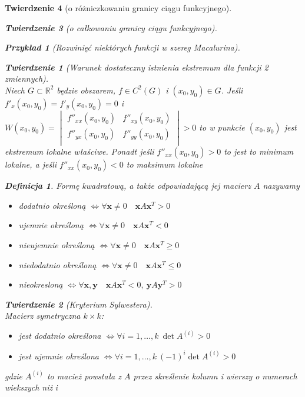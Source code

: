 \documentclass[12pt,a4paper]{article}
\newtheorem{tw}{Twierdzenie}
\newtheorem{przyklad}{Przykład}
\theoremstyle{definition}
\newtheorem{df}{Definicja}
\begin{document}
\begin{tw}[o różniczkowaniu granicy ciągu funkcyjnego]
\begin{tw}[o całkowaniu granicy ciągu funkcyjnego]
\begin{przyklad}[Rozwinięć niektórych funkcji w szereg Macalurina]
\begin{tw}[Warunek dostateczny istnienia ekstremum dla funkcji 2 zmiennych]~\\
Niech $G\subset \mathbb{R}^2$ będzie obszarem, $f\in C^2(G)$ i $(x_0,y_0) \in G$. Jeśli $f'_x(x_0, y_0) = f'_y(x_0,y_0) = 0$ i $W(x_0,y_0) = 
\begin{vmatrix}
	f''_{xx}(x_0,y_0) & f''_{xy}(x_0,y_0)\\
	f''_{yx}(x_0,y_0) & f''_{yy}(x_0,y_0)\\
\end{vmatrix} > 0$ to w punkcie $(x_0,y_0)$ jest ekstremum lokalne właściwe. Ponadt jeśli $f''_{xx}(x_0,y_0)>0$ to jest to minimum lokalne, a jeśli $f''_{xx}(x_0,y_0)<0$ to maksimum lokalne
\end{tw}

\begin{df}
Formę kwadratową, a także odpowiadającą jej macierz $A$ nazywamy
\begin{itemize}
	\item dodatnio określoną $\Leftrightarrow \forall \mathbf{x}\neq 0 \quad \mathbf{x}A\mathbf{x}^T > 0$
	\item ujemnie określoną $\Leftrightarrow \forall \mathbf{x}\neq 0 \quad \mathbf{x}A\mathbf{x}^T < 0$
	\item nieujemnie określoną $\Leftrightarrow \forall \mathbf{x}\neq 0 \quad \mathbf{x}A\mathbf{x}^T \geqslant 0$
	\item niedodatnio określoną $\Leftrightarrow \forall \mathbf{x}\neq 0 \quad \mathbf{x}A\mathbf{x}^T \leqslant 0$	
	\item nieokresloną $\Leftrightarrow \forall \mathbf{x,y} \quad \mathbf{x}A\mathbf{x}^T < 0,~ \mathbf{y}A\mathbf{y}^T > 0$
\end{itemize}
\end{df}

\begin{tw}[Kryterium Sylwestera]~\\
Macierz symetryczna $k\times k$:
\begin{itemize}
	\item jest dodatnio określona $\Leftrightarrow \forall i=1,\dots ,k ~ \det A^{(i)}>0$
	\item jest ujemnie określona $\Leftrightarrow \forall i=1,\dots ,k ~ (-1)^i\det A^{(i)}>0$
\end{itemize}
gdzie $A^{(i)}$ to macież powstała z $A$ przez skreślenie kolumn i wierszy o numerach wiekszych niż $i$
\end{tw}


\end{przyklad}
\end{tw}
\end{tw}
\end{document}
